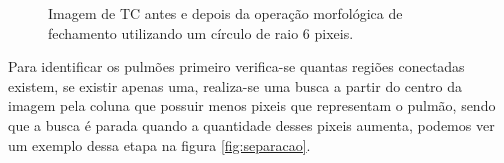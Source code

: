 \begin{figure}[ht]
 \begin{center}
 \end{center}
 \caption{Imagem de TC antes e depois da operação morfológica de fechamento utilizando um círculo de raio 6 pixeis.}
 \label{fig:fechamentoAplicado}
\end{figure}

Para identificar os pulmões primeiro verifica-se quantas regiões conectadas existem, se existir apenas uma, realiza-se uma busca a partir do centro da imagem pela coluna que possuir menos pixeis que representam o pulmão, sendo que a busca é parada quando a quantidade desses pixeis aumenta, podemos ver um exemplo dessa etapa na figura \ref{fig:separacao}.

